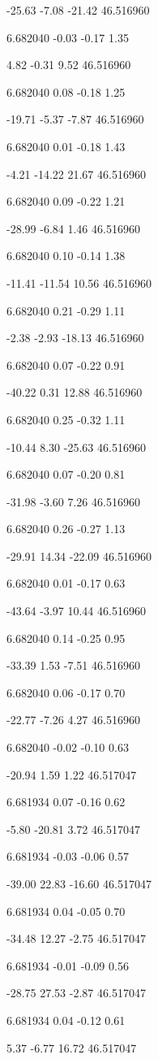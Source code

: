 -25.63
-7.08
-21.42
46.516960

6.682040
-0.03
-0.17
1.35

4.82
-0.31
9.52
46.516960

6.682040
0.08
-0.18
1.25

-19.71
-5.37
-7.87
46.516960

6.682040
0.01
-0.18
1.43

-4.21
-14.22
21.67
46.516960

6.682040
0.09
-0.22
1.21

-28.99
-6.84
1.46
46.516960

6.682040
0.10
-0.14
1.38

-11.41
-11.54
10.56
46.516960

6.682040
0.21
-0.29
1.11

-2.38
-2.93
-18.13
46.516960

6.682040
0.07
-0.22
0.91

-40.22
0.31
12.88
46.516960

6.682040
0.25
-0.32
1.11

-10.44
8.30
-25.63
46.516960

6.682040
0.07
-0.20
0.81

-31.98
-3.60
7.26
46.516960

6.682040
0.26
-0.27
1.13

-29.91
14.34
-22.09
46.516960

6.682040
0.01
-0.17
0.63

-43.64
-3.97
10.44
46.516960

6.682040
0.14
-0.25
0.95

-33.39
1.53
-7.51
46.516960

6.682040
0.06
-0.17
0.70

-22.77
-7.26
4.27
46.516960

6.682040
-0.02
-0.10
0.63

-20.94
1.59
1.22
46.517047

6.681934
0.07
-0.16
0.62

-5.80
-20.81
3.72
46.517047

6.681934
-0.03
-0.06
0.57

-39.00
22.83
-16.60
46.517047

6.681934
0.04
-0.05
0.70

-34.48
12.27
-2.75
46.517047

6.681934
-0.01
-0.09
0.56

-28.75
27.53
-2.87
46.517047

6.681934
0.04
-0.12
0.61

5.37
-6.77
16.72
46.517047

